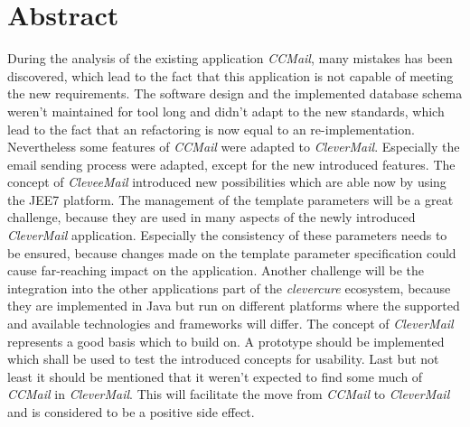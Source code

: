 \chapter{Abstract}
During the analysis of the existing application \emph{CCMail}, many mistakes has been discovered, which lead to the fact that this application is not capable of meeting the new requirements. The software design and the implemented database schema weren't maintained for tool long and didn't adapt to the new standards, which lead to the fact that an refactoring is now equal to an re-implementation. Nevertheless some features of \emph{CCMail} were adapted to \emph{CleverMail}. Especially the email sending process were adapted, except for the new introduced features. The concept of \emph{CleveeMail} introduced new possibilities which are able now by using the JEE7 platform. The management of the template parameters will be a great challenge, because they are used in many aspects of the newly introduced \emph{CleverMail} application. Especially the consistency of these parameters needs to be ensured, because changes made on the template parameter specification could cause far-reaching impact on the application.
\newline
\newline
Another challenge will be the integration into the other applications part of the \emph{clevercure} ecosystem, because they are implemented in Java but run on different platforms where the supported and available technologies and frameworks will differ. The concept of \emph{CleverMail} represents a good basis which to build on. A prototype should be implemented which shall be used to test the introduced concepts for usability. Last but not least it should be mentioned that it weren't expected to find some much of \emph{CCMail} in \emph{CleverMail}. This will facilitate the move from \emph{CCMail} to \emph{CleverMail} and is considered to be a positive side effect.